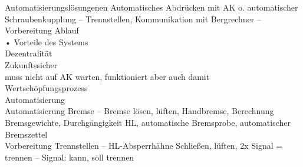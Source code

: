 Automatisierungslösungenen  Automatisches Abdrücken mit AK o. automatischer Schraubenkupplung – Trennstellen, Kommunikation mit Bergrechner – Vorbereitung Ablauf\\
• Vorteile des Systems\\
Dezentralität\\
Zukunftssicher\\
muss nicht auf AK warten, funktioniert aber auch damit\\
Wertschöpfungsprozess\\
Automatisierung\\
Automatisierung Bremse – Bremse lösen, lüften, Handbremse, Berechnung Bremsgewichte, Durchgängigkeit HL, automatische Bremsprobe, automatischer Bremszettel\\
Vorbereitung Trennstellen – HL-Absperrhähne Schließen, lüften, 2x Signal = trennen – Signal: kann, soll trennen